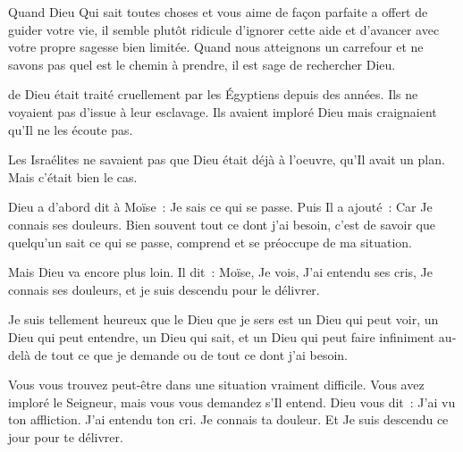 
Quand Dieu \ocadr{}Qui sait toutes choses et vous aime de façon parfaite\fcadr{}
 a offert de guider votre vie, il semble plutôt ridicule d'ignorer
 cette aide et d'avancer avec votre propre sagesse bien limitée.
 Quand nous atteignons un carrefour et ne savons pas
 quel est le chemin à prendre, il est sage de rechercher Dieu. 

\dvrule






 de Dieu était traité cruellement
 par les Égyptiens depuis des années.
 Ils ne voyaient pas d'issue à leur esclavage.
 Ils avaient imploré Dieu mais craignaient qu'Il ne les écoute pas.


Les Israélites ne savaient pas que Dieu était déjà à l'oeuvre,
 qu'Il avait un plan. Mais c'était bien le cas.

Dieu a d'abord dit à Moïse~: \og Je sais ce qui se passe. \fg{}
 Puis Il a ajouté~: \og Car Je connais ses douleurs. \fg{}
 Bien souvent tout ce dont j'ai besoin,
 c'est de savoir que quelqu'un sait ce qui se passe,
 comprend et se préoccupe de ma situation.

Mais Dieu va encore plus loin. Il dit~:
 \og Moïse, Je vois, J'ai entendu ses cris, Je connais ses douleurs,
 et je suis descendu pour le délivrer. \fg{}

Je suis tellement heureux que le Dieu que je sers est un Dieu qui peut voir,
 un Dieu qui peut entendre, un Dieu qui sait,
 et un Dieu qui peut faire infiniment au-delà
 de tout ce que je demande ou de tout ce dont j'ai besoin.

Vous vous trouvez peut-être dans une situation vraiment difficile.
 Vous avez imploré le Seigneur, mais vous vous demandez s'Il entend.
 Dieu vous dit~:
 \og J'ai vu ton affliction. J'ai entendu ton cri. Je connais ta douleur.
 Et Je suis descendu ce jour pour te délivrer. \fg{}

